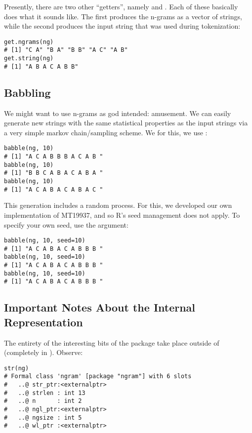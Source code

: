Presently, there are two other ``getters'', namely  and 
.  Each of these basically does what it sounds like.
The first produces the n-grams as a vector of strings, while the second
produces the input string that was used during tokenization:
\begin{lstlisting}[language=rr]
get.ngrams(ng)
# [1] "C A" "B A" "B B" "A C" "A B"
get.string(ng)
# [1] "A B A C A B B"
\end{lstlisting}




\subsection{Babbling}

We might want to use n-grams as god intended:  amusement.  We can easily
generate new strings with the same statistical properties as the input strings
via a very simple markov chain/sampling scheme.  We for this, we use 
:
\begin{lstlisting}[language=rr]
babble(ng, 10)
# [1] "A C A B B B A C A B "
babble(ng, 10)
# [1] "B B C A B A C A B A "
babble(ng, 10)
# [1] "A C A B A C A B A C "
\end{lstlisting}
This generation includes a random process.  For this, we developed our own 
implementation of MT19937, and so R's seed management does not apply.  To 
specify your own seed, use the  argument:
\begin{lstlisting}[language=rr]
babble(ng, 10, seed=10)
# [1] "A C A B A C A B B B "
babble(ng, 10, seed=10)
# [1] "A C A B A C A B B B "
babble(ng, 10, seed=10)
# [1] "A C A B A C A B B B "
\end{lstlisting}




\subsection{Important Notes About the Internal Representation}

The entirety of the interesting bits of the \thispackage package take place 
outside of \R (completely in \C).  Observe:
\begin{lstlisting}[language=rr]
str(ng)
# Formal class 'ngram' [package "ngram"] with 6 slots
#   ..@ str_ptr:<externalptr> 
#   ..@ strlen : int 13
#   ..@ n      : int 2
#   ..@ ngl_ptr:<externalptr> 
#   ..@ ngsize : int 5
#   ..@ wl_ptr :<externalptr> 
\end{lstlisting}

